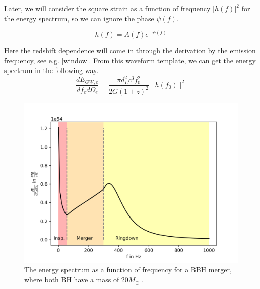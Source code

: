 Later, we will consider the square strain as a function of frequency $|h(f)|^2$ for the energy spectrum, so we can ignore the phase $\psi(f)$.

\begin{equation}
    h(f)=A(f)e^{-\psi(f)}
\end{equation}

Here the redshift dependence will come in through the derivation by the emission 
frequency, see e.g. \ref{window}. From this waveform template, we can get the energy 
spectrum in the following way.
\begin{equation}
    \frac{dE_{GW,e}}{df_e d\Omega_e} = \frac{\pi d_L^2 c^3f_0^2}{2G(1+z)^2}
    \mid h(f_0)\mid ^2
\end{equation}

\begin{figure}
    \centering
    \includegraphics[width=1\linewidth]{Images/dE_df_of_f.png}
    \caption{The energy spectrum as a function of frequency for a BBH merger, where both BH have a mass of 20$M_\odot\ $. }
    \label{dE_df_f}
\end{figure} 

